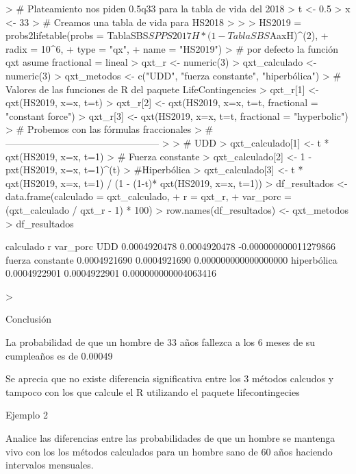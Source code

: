 \documentclass[12pt]{report}
\begin{document}
\begin{Schunk}
\begin{Sinput}
> # Plateamiento nos piden 0.5q33 para la tabla de vida del 2018
> t <- 0.5
> x <- 33
> # Creamos una tabla de vida para HS2018
> 
> 
> HS2019  = probs2lifetable(probs = TablaSBS$SPPS2017H * (1 - TablaSBS$AaxH)^(2), 
+                           radix = 10^6,   
+                           type = "qx",  
+                           name = "HS2019")
> # por defecto la función qxt asume fractional = lineal
> qxt_r <- numeric(3)
> qxt_calculado <- numeric(3)
> qxt_metodos <- c("UDD", "fuerza constante", "hiperbólica")
> # Valores de las funciones de R del paquete LifeContingencies
> qxt_r[1] <- qxt(HS2019, x=x, t=t)
> qxt_r[2] <- qxt(HS2019, x=x, t=t, fractional = "constant force")
> qxt_r[3] <- qxt(HS2019, x=x, t=t, fractional = "hyperbolic")
> # Probemos con las fórmulas fraccionales
> #------------------------------------------------
> 
> # UDD
> qxt_calculado[1] <- t * qxt(HS2019, x=x, t=1) 
> # Fuerza constante
> qxt_calculado[2] <- 1 - pxt(HS2019, x=x, t=1)^(t) 
> #Hiperbólica
> qxt_calculado[3] <- t * qxt(HS2019, x=x, t=1) / (1 - (1-t)* qxt(HS2019, x=x, t=1)) 
> df_resultados <- data.frame(calculado = qxt_calculado,
+                             r = qxt_r,
+                             var_porc = (qxt_calculado / qxt_r - 1) * 100)
> row.names(df_resultados) <- qxt_metodos
> df_resultados
\end{Sinput}
\begin{Soutput}
                    calculado            r              var_porc
UDD              0.0004920478 0.0004920478 -0.000000000011279866
fuerza constante 0.0004921690 0.0004921690  0.000000000000000000
hiperbólica      0.0004922901 0.0004922901  0.000000000004063416
\end{Soutput}
\begin{Sinput}
> 
\end{Sinput}
\end{Schunk}

Conclusión

La probabilidad de que un hombre de 33 años fallezca a los 6 meses de su cumpleaños es de 0.00049

Se aprecia que no existe diferencia significativa entre los 3 métodos calcudos y tampoco con los que calcule el R utilizando el paquete lifecontingecies


Ejemplo 2

Analice las diferencias entre las probabilidades de que un hombre se mantenga vivo con los los métodos calculados para un hombre sano de 60 años haciendo intervalos mensuales.
\end{document}
